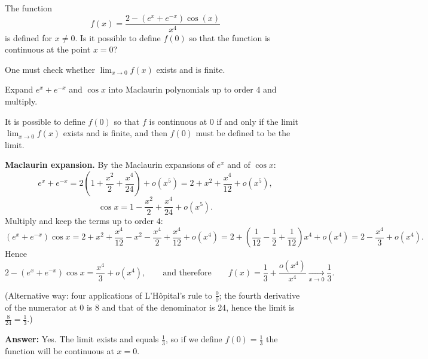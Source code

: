 
\begin{question}
The function
\[
f(x)=\frac{2-(e^x+e^{-x})\cos(x)}{x^4}
\]
is defined for $x\neq0$. Is it possible to define $f(0)$ so that the function is continuous at the point $x=0$?
\end{question}

\begin{hint}
One must check whether $\lim_{x\to0}f(x)$ exists and is finite.
\end{hint}

\begin{hint}
Expand $e^x+e^{-x}$ and $\cos x$ into Maclaurin polynomials up to order $4$ and multiply.
\end{hint}

\begin{solution}
It is possible to define $f(0)$ so that $f$ is continuous at $0$ if and only if the limit $\lim_{x\to0}f(x)$ exists and is finite, and then $f(0)$ must be defined to be the limit.

\textbf{Maclaurin expansion.} By the Maclaurin expansions of $e^x$ and of $\cos x$:
\[
e^x+e^{-x}=2\left(1+\frac{x^2}{2}+\frac{x^4}{24}\right)+o(x^5)=2+x^2+\frac{x^4}{12}+o(x^5),
\]
\[
\cos x=1-\frac{x^2}{2}+\frac{x^4}{24}+o(x^5).
\]
Multiply and keep the terms up to order $4$:
\[
(e^x+e^{-x})\cos x=2+x^2+\frac{x^4}{12}-x^2-\frac{x^4}{2}+\frac{x^4}{12}+o(x^4)
=2+\left(\frac{1}{12}-\frac12+\frac1{12}\right)x^4+o(x^4)=2-\frac{x^4}{3}+o(x^4).
\]
Hence
\[
2-(e^x+e^{-x})\cos x=\frac{x^4}{3}+o(x^4),
\qquad\text{and therefore}\qquad
f(x)=\frac13+\frac{o(x^4)}{x^4}\xrightarrow[x\to0]{}\frac13.
\]

(Alternative way: four applications of L'Hôpital's rule to $\frac{0}{0}$; the fourth derivative of the numerator at $0$ is $8$ and that of the denominator is $24$, hence the limit is $\frac{8}{24}=\frac13$.)

\textbf{Answer:} Yes. The limit exists and equals $\frac13$, so if we define $f(0)=\frac13$ the function will be continuous at $x=0$.
\end{solution}
